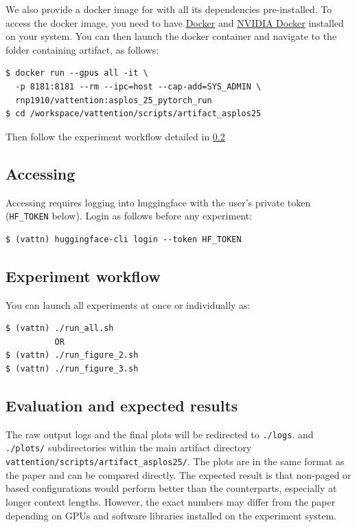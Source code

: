 We also provide a docker image for \sysname with all its dependencies pre-installed. To access the docker image, you need to have \href{https://docs.docker.com/engine/installation/}{Docker} and \href{https://github.com/NVIDIA/nvidia-docker/}{NVIDIA Docker} installed on your system. You can then launch the docker container and navigate to the folder containing \sysname artifact, as follows:
\begin{Verbatim}[frame=single,rulecolor=\color{black},fontfamily=zi4,fontsize=\small,xrightmargin=-5mm]
$ docker run --gpus all -it \
  -p 8181:8181 --rm --ipc=host --cap-add=SYS_ADMIN \
  rnp1910/vattention:asplos_25_pytorch_run
$ cd /workspace/vattention/scripts/artifact_asplos25  
\end{Verbatim}



Then follow the experiment workflow detailed in \ref{workflow}

\subsection{Accessing \llamasmall}

Accessing \llamasmall requires logging into huggingface with the user's private token (\verb|HF_TOKEN| below). Login as follows before any experiment:
\begin{Verbatim}[frame=single,rulecolor=\color{black},fontfamily=zi4,fontsize=\small]
$ (vattn) huggingface-cli login --token HF_TOKEN
\end{Verbatim}

\subsection{Experiment workflow} \label{workflow}
You can launch all experiments at once or individually as:

\begin{Verbatim}[frame=single,rulecolor=\color{black},fontfamily=zi4,fontsize=\small]
$ (vattn) ./run_all.sh
          OR
$ (vattn) ./run_figure_2.sh
$ (vattn) ./run_figure_3.sh 
\end{Verbatim}

\subsection{Evaluation and expected results}
The raw output logs and the final plots will be redirected to \verb|./logs|.  and \verb|./plots/| subdirectories within the main artifact directory \verb|vattention/scripts/artifact_asplos25/|. The plots are in the same format as the paper and can be compared directly. The expected result is that non-paged or \sysname based configurations would perform better than the \pa counterparts, especially at longer context lengths. However, the exact numbers may differ from the paper depending on GPUs and software libraries installed on the experiment system. 


